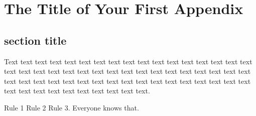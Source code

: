 \chapter{The Title of Your First Appendix}

\section{section title}
Text text text text text text text text text text text text text text
text text text text text text text text text text text text text text
text text text text text text text text text text text text text text
text text text text text text text text text text text text text text
text text text text text. 

Rule 1 Rule 2 Rule 3. Everyone knows that.
